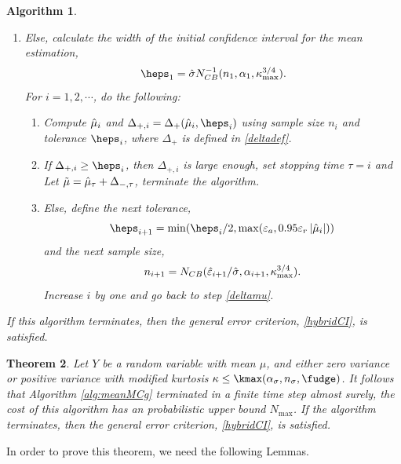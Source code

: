 \documentclass{iitthesis}
\newtheorem{theorem}{Theorem}[section]
\newtheorem{algorithm}[theorem]{Algorithm}
\begin{document}
\begin{algorithm}
\begin{enumerate}
$$n = N_{CB}(\varepsilon_a/\hsigma,\alpha_1,\kappa_{\max}^{3/4}).$$ Then, compute $\tmu$ using $n$ samples, terminate the algorithm.
\item Else, calculate the width of the initial confidence interval for the mean estimation,
\begin{align}\label{eps1def}
\heps_1=\hsigma N_{CB}^{-1}(n_1,\alpha_1,\kappa_{\max}^{3/4}).
\end{align}
For $i = 1,2,\cdots$, do the following:
\begin{enumerate}
\item  \label{deltamu}Compute $\hat{\mu}_i$ and $\Delta_{+,i}=\Delta_{+}(\hmu_i,\heps_i)$ using sample size $n_i$ and tolerance $\heps_i$, where $\Delta_{+}$ is defined in \eqref{deltadef}.
\item If $\Delta_{+,i} \geq  \heps_i$, then $\Delta_{+,i}$ is large enough, set stopping time $\tau = i$ and Let $\tilde{\mu} = \hat{\mu}_{\tau}+\Delta_{-, \tau}$, terminate the algorithm.
\item Else, define the next tolerance, $$\heps_{i+1} = \min(\heps_i/2, \max(\varepsilon_a,0.95\varepsilon_r\abs{\hmu_i}))$$ and the next sample size, $$n_{i+1} = N_{CB}(\hat{\varepsilon}_{i+1}/\hat{\sigma},\alpha_{i+1},\kappa_{\max}^{3/4}).$$ Increase $i$ by one and go back to step \ref{deltamu}. 
\end{enumerate}
\end{enumerate}
If this algorithm terminates, then the general error criterion, \eqref{hybridCI}, is satisfied.
\end{algorithm}

\begin{theorem}\label{thm:meanMCg}
Let $Y$ be a random variable with mean $\mu$, and either zero variance or positive variance with modified kurtosis $\kappa \leq \kmax(\alpha_\sigma, n_\sigma, \fudge)$. It follows that Algorithm \ref{alg:meanMCg} terminated in a finite time step almost surely, the cost of this algorithm has an probabilistic upper bound $N_{\max}$. If the algorithm terminates, then the general error criterion, \eqref{hybridCI}, is satisfied.
\end{theorem}
In order to prove this theorem, we need the following Lemmas.
\end{document}
